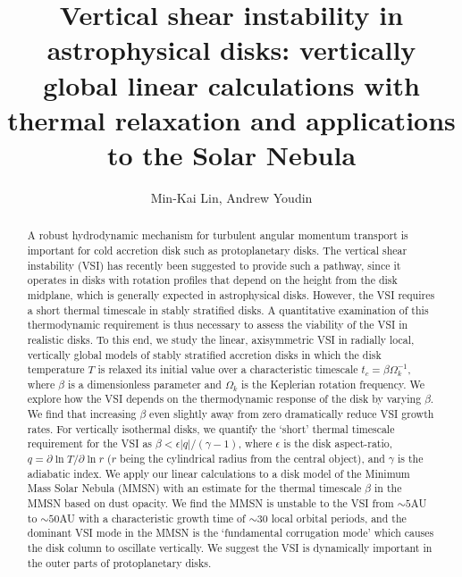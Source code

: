 \documentclass[iop]{emulateapj}
\newcommand{\p}{\partial}
\begin{document}
\title{Vertical shear instability in astrophysical disks: vertically global linear calculations with thermal relaxation and applications to the Solar Nebula} 
\author{Min-Kai Lin, Andrew Youdin}

\begin{abstract}
  A robust hydrodynamic mechanism for turbulent angular momentum
  transport is important for cold accretion disk such as 
  protoplanetary disks. The vertical shear instability (VSI) has 
  recently been suggested to provide such a pathway, since it operates in
  disks with rotation profiles that depend on the height from the 
  disk midplane, which is generally expected in  
  astrophysical disks. However, the VSI requires a short thermal
  timescale in stably stratified disks.  
  A quantitative examination of this thermodynamic 
  requirement is thus necessary to assess the viability of
  the VSI in realistic disks. To this end,  
  we study the linear, axisymmetric VSI in radially local, 
  vertically global models of stably stratified accretion disks in which the disk  
  temperature $T$ is relaxed its initial value over a characteristic timescale 
  $t_c=\beta\Omega_k^{-1}$, where $\beta$ is a dimensionless parameter 
  and $\Omega_k$ is the Keplerian rotation frequency. We explore how
  the VSI depends on the thermodynamic response of the disk by
  varying $\beta$. We find that 
  increasing $\beta$ even slightly away from    
  zero dramatically reduce VSI growth rates. 
  For vertically isothermal disks, we quantify the
  `short' thermal timescale requirement for the VSI as $\beta < \epsilon|q|/(\gamma-1)$, where
  $\epsilon$ is the disk aspect-ratio, $q = \p\ln T/\p\ln r$  ($r$
  being the cylindrical radius from the central object), and 
  $\gamma$ is the adiabatic index. 
  We apply our linear calculations  
  to a disk model of the Minimum Mass Solar Nebula (MMSN) with an  
  estimate for the thermal timescale $\beta$ in the MMSN based on dust
  opacity. We find the MMSN is unstable to the VSI from $\sim 5$AU to $\sim 50$AU with  
  a characteristic growth time of $\sim 30$ local orbital 
  periods, and the dominant VSI mode in the MMSN is the `fundamental
  corrugation mode' which causes the disk column to oscillate
  vertically. We suggest the VSI is dynamically important in the outer
  parts of protoplanetary disks. 
\end{abstract}
\end{document}
